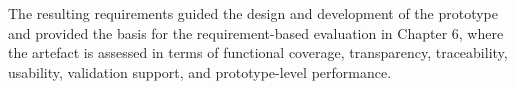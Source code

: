 The resulting requirements guided the design and development of the prototype and provided the basis for the requirement-based evaluation in Chapter 6, where the artefact is assessed in terms of functional coverage, transparency, traceability, usability, validation support, and prototype-level performance.




















